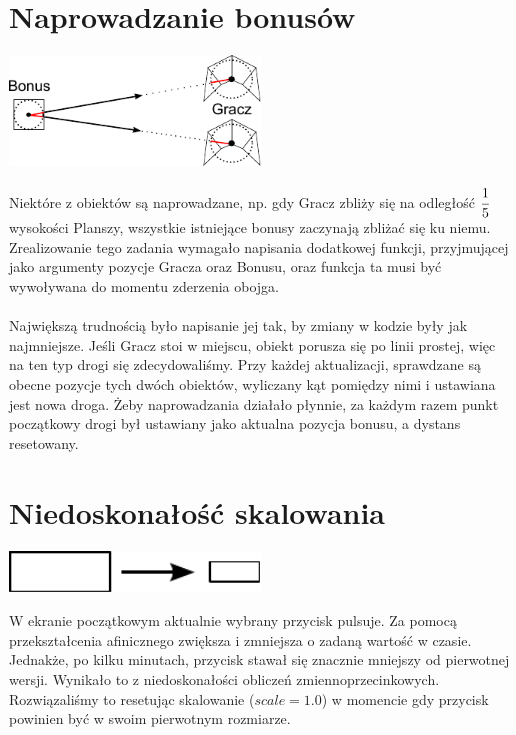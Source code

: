 \documentclass[a4paper,twoside]{article}
\begin{document}
		\section{Naprowadzanie bonusów}
			\begin{center}
				\includegraphics[width=0.5\textwidth]{./images/kolizje02}
			\end{center}
			Niektóre z obiektów są naprowadzane, np. gdy Gracz zbliży się na odległość $\cfrac{1}{5} $ wysokości Planszy, wszystkie istniejące bonusy zaczynają zbliżać się ku niemu. Zrealizowanie tego zadania wymagało napisania dodatkowej funkcji, przyjmującej jako argumenty pozycje Gracza oraz Bonusu, oraz funkcja ta musi być wywoływana do momentu zderzenia obojga.\\\\
			Największą trudnością było napisanie jej tak, by zmiany w kodzie były jak najmniejsze. Jeśli Gracz stoi w miejscu, obiekt porusza się po linii prostej, więc na ten typ drogi się zdecydowaliśmy. Przy każdej aktualizacji, sprawdzane są obecne pozycje tych dwóch obiektów, wyliczany kąt pomiędzy nimi i ustawiana jest nowa droga. Żeby naprowadzania działało płynnie, za każdym razem punkt początkowy drogi był ustawiany jako aktualna pozycja bonusu, a dystans resetowany.
			
		\section{Niedoskonałość skalowania}
			\begin{center}
				\includegraphics[width=0.5\textwidth]{./images/affine01}
			\end{center}
			W ekranie początkowym aktualnie wybrany przycisk pulsuje. Za pomocą przekształcenia afinicznego zwiększa i zmniejsza o zadaną wartość w czasie. Jednakże, po kilku minutach, przycisk stawał się znacznie mniejszy od pierwotnej wersji. Wynikało to z niedoskonałości obliczeń zmiennoprzecinkowych.\\
			Rozwiązaliśmy to resetując skalowanie ($ scale = 1.0 $) w momencie gdy przycisk powinien być w swoim pierwotnym rozmiarze.
			
\end{document}
